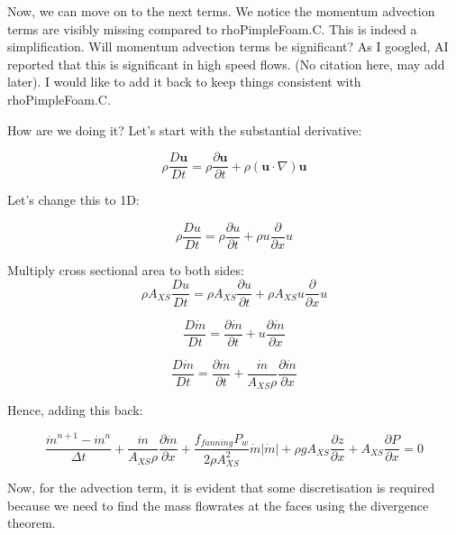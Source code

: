 \documentclass[masters]{ucbthesis}
\renewcommand{\_}{\kern-1.5pt\textunderscore\kern-1.5pt}
\begin{document}
Now, we can move on to the next terms. We notice the momentum advection 
terms are visibly missing compared to rhoPimpleFoam.C. This is indeed a 
simplification. Will momentum advection terms be significant? 
As I googled, AI reported that this is significant in high speed flows. (No 
citation here, may add later). I would like to add it back to keep things 
consistent with rhoPimpleFoam.C.

How are we doing it? Let's start with the substantial derivative:

\begin{equation*}
	\rho \frac{D \mathbf{u}}{D t} 
	= 
	\rho \frac{\partial \mathbf{u}}{\partial t}
	+ 
	\rho (\mathbf{u} \cdot \nabla) \mathbf{u}
\end{equation*}

Let's change this to 1D:

\begin{equation*}
	\rho \frac{D u}{D t} 
	= 
	\rho \frac{\partial u}{\partial t}
	+ 
	\rho u \frac{\partial}{\partial x} u
\end{equation*}

Multiply cross sectional area to both sides:
\begin{equation*}
	\rho A_{XS} \frac{D u}{D t} 
	= 
	\rho A_{XS} \frac{\partial u}{\partial t}
	+ 
	\rho A_{XS} u \frac{\partial}{\partial x} u
\end{equation*}

\begin{equation*}
	 \frac{D \dot{m}}{D t} 
	= 
	\frac{\partial \dot{m}}{\partial t}
	+ 
	u \frac{\partial \dot{m}}{\partial x} 
\end{equation*}


\begin{equation*}
	 \frac{D \dot{m}}{D t} 
	= 
	\frac{\partial \dot{m}}{\partial t}
	+ 
	\frac{\dot{m}}{A_{XS} \rho} \frac{\partial \dot{m}}{\partial x} 
\end{equation*}


Hence, adding this back:


\begin{equation*} 
	\frac{\dot{m}^{n+1} - \dot{m}^n}{\Delta t}
	+ \frac{\dot{m}}{A_{XS} \rho} \frac{\partial \dot{m}}{\partial x} 
	+\frac{f_{fanning} P_w}{2 \rho A_{XS}^2} \dot{m} |\dot{m}|
	+ \rho g A_{XS} \frac{\partial z}{\partial x}
	+ A_{XS} \frac{\partial P}{\partial x} = 0
\end{equation*}

Now, for the advection term, it is evident that some discretisation 
is required because we need to find the mass flowrates at the faces 
using the divergence theorem. 
\end{document}
